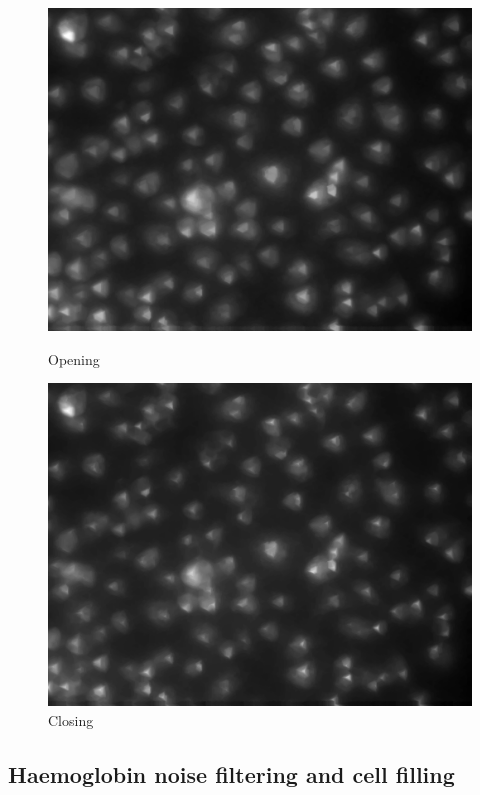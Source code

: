 \documentclass{article}
\begin{document}
\begin{figure}[ht]
\begin{minipage}[b]{0.5\linewidth}
    \includegraphics[width=.95\linewidth]{opening.png} 
    \caption{Opening} 
    \vspace{4ex}
  \end{minipage}%
  \begin{minipage}[b]{0.5\linewidth}
    \centering
    \includegraphics[width=.95\linewidth]{nuclei_closing.png} 
    \caption{Closing} 
    \vspace{4ex}
  \end{minipage} 
\end{figure} 
\vspace{8mm}


\subsection{Haemoglobin noise filtering and cell filling}
\vspace{4mm}
\end{document}
